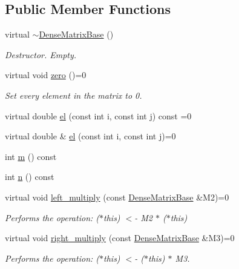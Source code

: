 \subsection*{Public Member Functions}
\begin{DoxyCompactItemize}
\item 
virtual \mbox{\hyperlink{classfemus_1_1_dense_matrix_base_a510ea66cd4568cef36b561f90332dab5}{$\sim$\+Dense\+Matrix\+Base}} ()
\begin{DoxyCompactList}\small\item\em Destructor. Empty. \end{DoxyCompactList}\item 
virtual void \mbox{\hyperlink{classfemus_1_1_dense_matrix_base_a25fc3a015ffb804afc61b8a33c9565d1}{zero}} ()=0
\begin{DoxyCompactList}\small\item\em Set every element in the matrix to 0. \end{DoxyCompactList}\item 
virtual double \mbox{\hyperlink{classfemus_1_1_dense_matrix_base_abaf98d937069f9df0829353d9454ad93}{el}} (const int i, const int j) const =0
\item 
virtual double \& \mbox{\hyperlink{classfemus_1_1_dense_matrix_base_ab1f58e98ca5000e197fce3013a019dc4}{el}} (const int i, const int j)=0
\item 
int \mbox{\hyperlink{classfemus_1_1_dense_matrix_base_a67a582a53ab5ce7628a53f6a90fd39b9}{m}} () const
\item 
int \mbox{\hyperlink{classfemus_1_1_dense_matrix_base_a1d9b513340794a8b15640f9c8cc6597e}{n}} () const
\item 
virtual void \mbox{\hyperlink{classfemus_1_1_dense_matrix_base_af08f7a07a6b6a9486502a8af234de32c}{left\+\_\+multiply}} (const \mbox{\hyperlink{classfemus_1_1_dense_matrix_base}{Dense\+Matrix\+Base}} \&M2)=0
\begin{DoxyCompactList}\small\item\em Performs the operation\+: ($\ast$this) $<$-\/ M2 $\ast$ ($\ast$this) \end{DoxyCompactList}\item 
virtual void \mbox{\hyperlink{classfemus_1_1_dense_matrix_base_a34072947783a0b4d797d04647cc3c646}{right\+\_\+multiply}} (const \mbox{\hyperlink{classfemus_1_1_dense_matrix_base}{Dense\+Matrix\+Base}} \&M3)=0
\begin{DoxyCompactList}\small\item\em Performs the operation\+: ($\ast$this) $<$-\/ ($\ast$this) $\ast$ M3. \end{DoxyCompactList}\item 

\end{DoxyCompactItemize}
